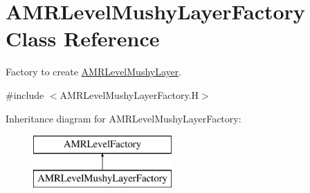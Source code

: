 \hypertarget{class_a_m_r_level_mushy_layer_factory}{\section{A\-M\-R\-Level\-Mushy\-Layer\-Factory Class Reference}
\label{class_a_m_r_level_mushy_layer_factory}
}


Factory to create \hyperlink{class_a_m_r_level_mushy_layer}{A\-M\-R\-Level\-Mushy\-Layer}.  




{\ttfamily \#include $<$A\-M\-R\-Level\-Mushy\-Layer\-Factory.\-H$>$}

Inheritance diagram for A\-M\-R\-Level\-Mushy\-Layer\-Factory\-:\begin{figure}[H]
\begin{center}
\leavevmode
\includegraphics[height=2.000000cm]{class_a_m_r_level_mushy_layer_factory}
\end{center}
\end{figure}
